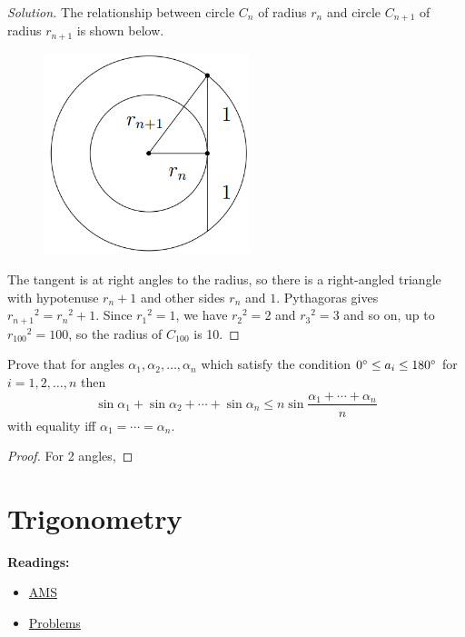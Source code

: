 \begin{proof}[Solution]
The relationship between circle $C_n$ of radius $r_n$ and circle $C_{n+1}$ of radius $r_{n+1}$ is shown below.
\begin{figure}[H]
    \centering
    \includegraphics[width=6cm]{images/c_n_circles.png}
\end{figure}

The tangent is at right angles to the radius, so there is a right-angled triangle with hypotenuse $r_n+1$ and other sides $r_n$ and $1$. Pythagoras gives ${r_{n+1}}^2 = {r_n}^2 + 1$. Since ${r_1}^2 = 1$, we have ${r_2}^2 = 2$ and ${r_3}^2 = 3$ and so on, up to ${r_{100}}^2 = 100$, so the radius of $C_100$ is 10.
\end{proof}
\pagebreak

\begin{prbm}
Prove that for angles $\alpha_1, \alpha_2, \dots, \alpha_n$ which satisfy the condition $0\degree \le a_i \le 180\degree$ for $i=1,2,\dots,n$ then
\[ \sin\alpha_1 + \sin\alpha_2 + \cdots + \sin\alpha_n \le n \sin\frac{\alpha_1+\cdots+\alpha_n}{n} \]
with equality iff $\alpha_1 = \cdots = \alpha_n$.
\end{prbm}

\begin{proof}
For 2 angles, 

\end{proof}

\chapter{Trigonometry}
\textbf{Readings:}
\begin{itemize}
\item \href{https://www.ams.org/books/prb/025/prb025-endmatter.pdf}{AMS}
\item \href{https://mathematicalolympiads.files.wordpress.com/2012/08/103-trigonometry-problems-titu-andreescu-zuming-feng.pdf}{Problems}
\end{itemize}

